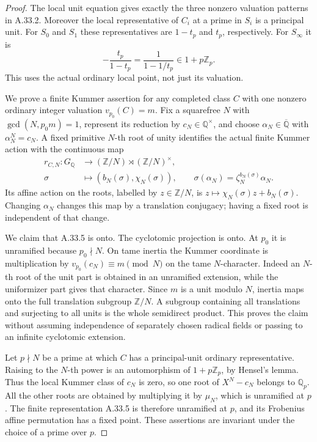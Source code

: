 \begin{proof}
The local unit equation gives exactly the three nonzero valuation
patterns in A.33.2.  Moreover the local representative of \(C_i\)
at a prime in \(S_i\) is a principal unit.  For \(S_0\) and \(S_1\)
these representatives are \(1-t_p\) and \(t_p\), respectively.
For \(S_\infty\) it is
\[
               -\frac{t_p}{1-t_p}
                         =\frac1{1-1/t_p}\in1+p\mathbb Z_p.
\tag{A.33.4}
\]
This uses the actual ordinary local point, not just its valuation.

We prove a finite Kummer assertion for any completed class \(C\)
with one nonzero ordinary integer valuation
\(v_{p_0}(C)=m\).  Fix a squarefree \(N\) with
\(\gcd(N,p_0m)=1\), represent its reduction by
\(c_N\in\mathbb Q^\times\), and choose
\(\alpha_N\in\overline{\mathbb Q}\) with
\(\alpha_N^N=c_N\).  A fixed primitive \(N\)-th root of unity
identifies the actual finite Kummer action with the continuous map
\[
 \begin{split}
 r_{C,N}:G_{\mathbb Q}&\longrightarrow
       (\mathbb Z/N)\rtimes(\mathbb Z/N)^\times,\\
 \sigma&\longmapsto(b_N(\sigma),\chi_N(\sigma)),
 \qquad \sigma(\alpha_N)=\zeta_N^{b_N(\sigma)}\alpha_N .
 \end{split}
\tag{A.33.5}
\]
Its affine action on the roots, labelled by \(z\in\mathbb Z/N\),
is \(z\mapsto\chi_N(\sigma)z+b_N(\sigma)\).
Changing \(\alpha_N\) changes this map by a translation conjugacy;
having a fixed root is independent of that change.

We claim that A.33.5 is onto.  The cyclotomic projection is onto.
At \(p_0\) it is unramified because \(p_0\nmid N\).
On tame inertia the Kummer coordinate is multiplication by
\(v_{p_0}(c_N)\equiv m\pmod N\) on the tame \(N\)-character.
Indeed an \(N\)-th root of the unit part is obtained in an unramified
extension, while the uniformizer part gives that character.
Since \(m\) is a unit modulo \(N\), inertia maps onto the full
translation subgroup \(\mathbb Z/N\).  A subgroup containing all
translations and surjecting to all units is the whole semidirect
product.  This proves the claim without assuming independence of
separately chosen radical fields or passing to an infinite cyclotomic
extension.

Let \(p\nmid N\) be a prime at which \(C\) has a principal-unit
ordinary representative.  Raising to the \(N\)-th power is an
automorphism of \(1+p\mathbb Z_p\), by Hensel's lemma.  Thus the
local Kummer class of \(c_N\) is zero, so one root of
\(X^N-c_N\) belongs to \(\mathbb Q_p\).
All the other roots are obtained by multiplying it by \(\mu_N\),
which is unramified at \(p\).  The finite representation A.33.5 is
therefore unramified at \(p\), and its Frobenius affine permutation
has a fixed point.  These assertions are invariant under the choice
of a prime over \(p\).


\end{proof}
